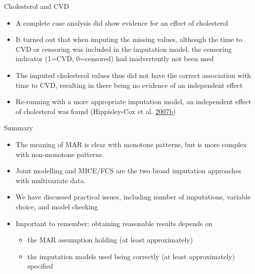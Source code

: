 \documentclass[ignorenonframetext,]{beamer}
\providecommand{\tightlist}{%
  \setlength{\itemsep}{0pt}\setlength{\parskip}{0pt}}
\begin{document}
\begin{frame}{Cholesterol and CVD}
\protect\hypertarget{cholesterol-and-cvd-1}{}

\begin{itemize}
\tightlist
\item
  A complete case analysis did show evidence for an effect of
  cholesterol
\item
  It turned out that when imputing the missing values, although the time
  to CVD or censoring was included in the imputation model, the
  censoring indicator (1=CVD, 0=censored) had inadvertently not been
  used
\item
  The imputed cholesterol values thus did not have the correct
  association with time to CVD, resulting in there being no evidence of
  an independent effect
\item
  Re-running with a more appropriate imputation model, an independent
  effect of cholesterol was found (Hippisley-Cox et al.
  \protect\hyperlink{ref-Hippisley-Cox2007a}{2007}\protect\hyperlink{ref-Hippisley-Cox2007a}{b})
\end{itemize}

\end{frame}

\begin{frame}{Summary}
\protect\hypertarget{summary}{}

\begin{itemize}
\tightlist
\item
  The meaning of MAR is clear with monotone patterns, but is more
  complex with non-monotone patterns.
\item
  Joint modelling and MICE/FCS are the two broad imputation approaches
  with multivariate data.
\item
  We have discussed practical issues, including number of imputations,
  variable choice, and model checking
\item
  Important to remember: obtaining reasonable results depends on

  \begin{itemize}
  \tightlist
  \item
    the MAR assumption holding (at least approximately)
  \item
    the imputation models used being correctly (at least approximately)
    specified
  \end{itemize}
\end{itemize}

\end{frame}
\end{document}
